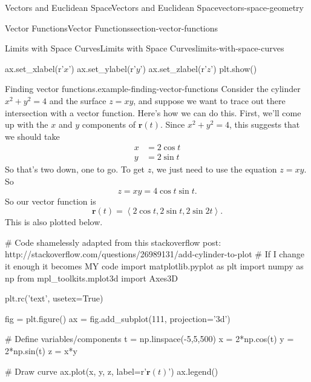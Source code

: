 \documentclass[oneside,10pt,]{book}
\numberwithin{equation}{section}
\newcommand{\vv}[1]{\mathbf{#1}}
\newcommand{\dotprod}[1]{\left\langle #1 \right\rangle}
\begin{document}
\begin{chapterptx}{Vectors and Euclidean Space}{}{Vectors and Euclidean Space}{}{}{vectors-space-geometry}
\begin{sectionptx}{Vector Functions}{}{Vector Functions}{}{}{section-vector-functions}
\begin{subsectionptx}{Limits with Space Curves}{}{Limits with Space Curves}{}{}{limits-with-space-curves}
\begin{sageinput}
ax.set_xlabel(r'$x$')
ax.set_ylabel(r'$y$')
ax.set_zlabel(r'$z$')
plt.show()
\end{sageinput}
\begin{example}{Finding vector functions.}{example-finding-vector-functions}%
\hypertarget{p-1258}{}%
Consider the cylinder \(x^{2}+y^{2}=4\) and the surface \(z=xy\), and suppose we want to trace out there intersection with a vector function. Here's how we can do this. First, we'll come up with the \(x\) and \(y\) components of \(\vv{r}(t)\). Since \(x^{2}+y^{2} = 4\), this suggests that we should take%
%
\begin{align*}
x & = 2\cos t \\
y & = 2\sin t 
\end{align*}
\hypertarget{p-1259}{}%
So that's two down, one to go. To get \(z\), we just need to use the equation \(z=xy\). So%
%
\begin{equation*}
z = xy = 4\cos t\sin t.
\end{equation*}
\hypertarget{p-1260}{}%
So our vector function is%
%
\begin{equation*}
\vv{r}(t) = \dotprod{2\cos t, 2\sin t, 2\sin 2t}.
\end{equation*}
\hypertarget{p-1261}{}%
This is also plotted below.%
\end{example}
\begin{sageinput}
# Code shamelessly adapted from this stackoverflow post: http://stackoverflow.com/questions/26989131/add-cylinder-to-plot
# If I change it enough it becomes MY code
import matplotlib.pyplot as plt
import numpy as np
from mpl_toolkits.mplot3d import Axes3D

plt.rc('text', usetex=True)

fig = plt.figure()
ax = fig.add_subplot(111, projection='3d')

# Define variables/components
t = np.linspace(-5,5,500)
x = 2*np.cos(t)
y = 2*np.sin(t)
z = x*y

# Draw curve
ax.plot(x, y, z, label=r'$\mathbf{r}(t)$')
ax.legend()


\end{sageinput}
\end{subsectionptx}
\end{sectionptx}
\end{chapterptx}
\end{document}
